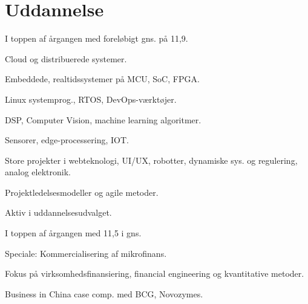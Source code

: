 \documentclass[a4paper]{janus-resume}
\begin{document}
\begin{minipage}[t]{0.49\textwidth} %


\section{Uddannelse} 

I toppen af årgangen med foreløbigt gns. på 11,9.
\vspace{\topsep}
\begin{tightitemize}
\item Cloud og distribuerede systemer.
\item Embeddede, realtidssystemer på MCU, SoC, FPGA. \\
\item Linux systemprog., RTOS, DevOps-værktøjer. \\
\item DSP, Computer Vision, machine learning algoritmer. \\
\item Sensorer, edge-processering, IOT. \\
\item Store projekter i webteknologi, UI/UX, robotter, dynamiske sys. og regulering, analog elektronik. \\
\item Projektledelsesmodeller og agile metoder.
\item Aktiv i uddannelsesudvalget.
\end{tightitemize}

\sectionspace %

I toppen af årgangen med 11,5 i gns.
\begin{tightitemize}
\item Speciale: Kommercialisering af mikrofinans. \\
\item Fokus på virksomhedsfinansiering, financial engineering og kvantitative metoder. \\
\item Business in China case comp. med BCG, Novozymes. \\
\end{tightitemize}


\end{minipage}
\end{document}
